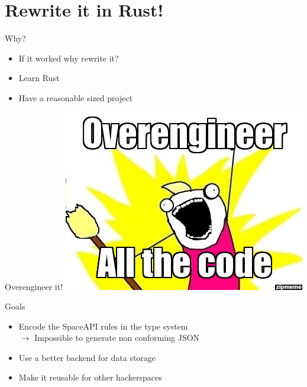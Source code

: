 \section{Rewrite it in Rust!}

\begin{frame}[c]{Why?}
    \begin{itemize}
        \item If it worked why rewrite it?
        \pause\item Learn Rust
        \item Have a reasonable sized project
    \end{itemize}
\end{frame}

\begin{frame}[c]{Overengineer it!}
    \centering
    \includegraphics[height=0.8\textheight]{./spaceapi_in_rust/overengineer_all_the_things.jpg}
\end{frame}

\begin{frame}[c]{Goals}
    \begin{itemize}
        \item Encode the SpaceAPI rules in the type system \\
            $\rightarrow$ Impossible to generate non conforming JSON
        \item Use a better backend for data storage
        \item Make it reusable for other hackerspaces
    \end{itemize}
\end{frame}
